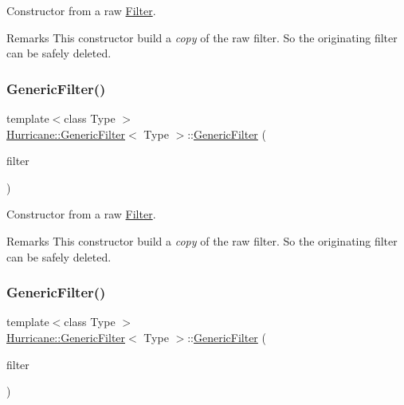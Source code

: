 Constructor from a raw \mbox{\hyperlink{classHurricane_1_1Filter}{Filter}}.

\begin{DoxyRemark}{Remarks}
This constructor build a {\itshape copy} of the raw filter. So the originating filter can be safely deleted. 
\end{DoxyRemark}
\mbox{\label{classHurricane_1_1GenericFilter_adf44866e7507f45dd0d612743f2d9a71}} 
\subsubsection{\texorpdfstring{Generic\+Filter()}{GenericFilter()}\hspace{0.1cm}{\footnotesize\ttfamily [2/3]}}
{\footnotesize\ttfamily template$<$class Type $>$ \\
\mbox{\hyperlink{classHurricane_1_1GenericFilter}{Hurricane\+::\+Generic\+Filter}}$<$ Type $>$\+::\mbox{\hyperlink{classHurricane_1_1GenericFilter}{Generic\+Filter}} (\begin{DoxyParamCaption}\item[{const \mbox{\hyperlink{classHurricane_1_1GenericFilter}{Generic\+Filter}}$<$ Type $>$ \&}]{filter }\end{DoxyParamCaption})\hspace{0.3cm}{\ttfamily [inline]}}

Constructor from a raw \mbox{\hyperlink{classHurricane_1_1Filter}{Filter}}.

\begin{DoxyRemark}{Remarks}
This constructor build a {\itshape copy} of the raw filter. So the originating filter can be safely deleted. 
\end{DoxyRemark}
\mbox{\label{classHurricane_1_1GenericFilter_aac847f0c0d6ee640c54847e374287fe1}} 
\subsubsection{\texorpdfstring{Generic\+Filter()}{GenericFilter()}\hspace{0.1cm}{\footnotesize\ttfamily [3/3]}}
{\footnotesize\ttfamily template$<$class Type $>$ \\
\mbox{\hyperlink{classHurricane_1_1GenericFilter}{Hurricane\+::\+Generic\+Filter}}$<$ Type $>$\+::\mbox{\hyperlink{classHurricane_1_1GenericFilter}{Generic\+Filter}} (\begin{DoxyParamCaption}\item[{\mbox{\hyperlink{classHurricane_1_1Filter}{Filter}}$<$ Type $>$ $\ast$}]{filter }\end{DoxyParamCaption})\hspace{0.3cm}{\ttfamily [inline]}}

